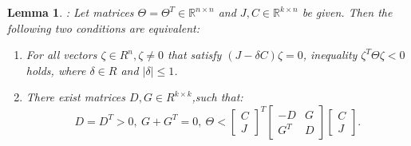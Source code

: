 \documentclass[]{interact}
\theoremstyle{plain}%
\newtheorem{lemma}[theorem]{Lemma}
\theoremstyle{definition}
\theoremstyle{remark}
\newtheorem{remark}{Remark}
\begin{document}
\begin{lemma} \label{lemma:4}
	{\rm \citep{Zhang2010}:} Let matrices $\Theta = \Theta^T \in \mathbb{R}^{n\times n}$ and $J, C\in \mathbb{R}^{k\times n}$ be given. Then the following two conditions are equivalent: 
	\begin{enumerate}
	\item For all  vectors $\zeta\in R^n,\zeta \neq 0$ that satisfy $(J-\delta C)\zeta=0$, inequality $\zeta^T\Theta \zeta<0$ holds, where $\delta\in R$ and $\left|\delta\right|\le 1$.
	\\
	\item There exist matrices  $D,G\in R^{k\times k}$,such that:
	\begin{equation}\nonumber
	D=D^T>0, \ G+G^T=0,\ \Theta<\begin{bmatrix}
	C \\
	J\end{bmatrix}^T
	\begin{bmatrix}
	-D & G \\
	G^T & D
	\end{bmatrix}
	\begin{bmatrix}
	C \\
	J
	\end{bmatrix}.
	\end{equation}
	\end{enumerate}
\end{lemma}
\end{document}
